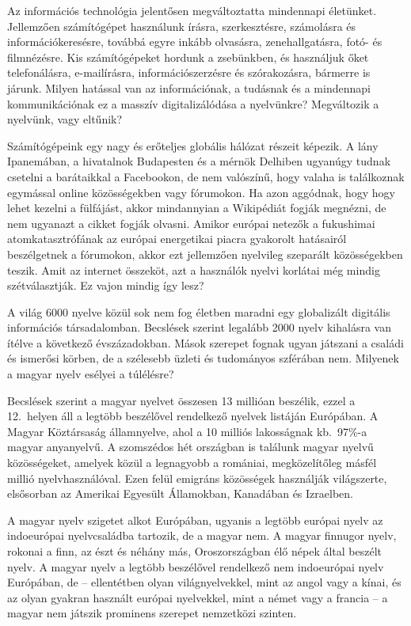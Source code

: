   \begin{multicols}{2}
  Az információs technológia jelentősen megváltoztatta mindennapi életünket. Jel\-lem\-ző\-en számítógépet használunk írásra, szerkesztésre, számolásra és in\-for\-má\-ció\-ke\-re\-sés\-re, továbbá egyre inkább olvasásra, zenehallgatásra, fotó- és filmnézésre. Kis szá\-mí\-tó\-gé\-pe\-ket hordunk a zsebünkben, és használjuk őket telefonálásra, e-mailírásra, információszerzésre és szórakozásra, bármerre is járunk. Milyen hatással van az információnak, a tudásnak és a mindennapi kommunikációnak ez a masszív digitalizálódása a nyelvünkre? Megváltozik a nyelvünk, vagy eltűnik? 

  Számítógépeink egy nagy és erőteljes globális hálózat részeit képezik. A lány Ipa\-ne\-má\-ban, a hivatalnok Budapesten és a mérnök Delhiben ugyanúgy tudnak csetelni a barátaikkal a Facebookon, de nem valószínű, hogy valaha is találkoznak egymással online közösségekben vagy fórumokon. Ha azon aggódnak, hogy hogy lehet kezelni a fülfájást, akkor mindannyian a Wikipédiát fogják megnézni, de nem ugyanazt a cikket fogják olvasni. Amikor európai netezők a fukushimai atomkatasztrófának az európai energetikai piacra gyakorolt hatásairól beszélgetnek a fórumokon, akkor ezt jellemzően nyelvileg szeparált közösségekben teszik. Amit az internet összeköt, azt a használók nyelvi korlátai még mindig szétválasztják. Ez vajon mindig így lesz?

  A világ 6000 nyelve közül sok nem fog életben maradni egy globalizált digitális információs társadalomban. Becslések szerint legalább 2000 nyelv kihalásra van ítélve a következő évszázadokban. Mások szerepet fognak ugyan játszani a családi és ismerősi körben, de a szélesebb üzleti és tudományos szférában nem. Milyenek a magyar nyelv esélyei a túlélésre?

  Becs\-lé\-sek szerint a magyar nyelvet összesen 13 millióan beszélik, ezzel a 12.~helyen áll a legtöbb beszélővel rendelkező nyelvek listáján Európában. A Magyar Köztársaság államnyelve, ahol a 10 milliós lakosságnak kb.~97\%-a magyar anyanyelvű. A szomszédos hét országban is találunk ma\-gyar nyelvű közösségeket, amelyek közül a legnagyobb a romániai, megközelítőleg másfél millió nyelvhasználóval. Ezen felül emig\-ráns közösségek használják világszerte, elsősorban az Amerikai Egyesült Államokban, Kanadában és Izraelben.   

  A magyar nyelv szigetet alkot Európában, ugyanis a legtöbb európai nyelv az indoeurópai nyelvcsaládba tartozik, de a magyar nem. A magyar finnugor nyelv, rokonai a finn, az észt és néhány más, Oroszországban élő népek által beszélt nyelv. A magyar nyelv a legtöbb beszélővel rendelkező nem indoeurópai nyelv Európában, de -- ellentétben olyan világnyelvekkel, mint az angol vagy a kínai, és az olyan gyakran használt európai nyelvekkel, mint a német vagy a francia -- a magyar nem játszik prominens szerepet nemzetközi szinten. 


\end{multicols}
